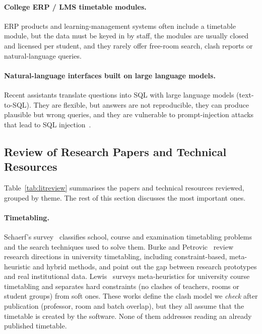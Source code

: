 \paragraph{College ERP / LMS timetable modules.}
ERP products and learning-management systems often include a timetable module, but the data must be
keyed in by staff, the modules are usually closed and licensed per student, and they rarely offer
free-room search, clash reports or natural-language queries.

\paragraph{Natural-language interfaces built on large language models.}
Recent assistants translate questions into SQL with large language models (text-to-SQL). They are
flexible, but answers are not reproducible, they can produce plausible but wrong queries, and they
are vulnerable to prompt-injection attacks that lead to SQL injection~\cite{pedro2023,greshake2023}.

\subsection{Review of Research Papers and Technical Resources}
Table~\ref{tab:litreview} summarises the papers and technical resources reviewed, grouped by
theme. The rest of this section discusses the most important ones.

\paragraph{Timetabling.}
Schaerf's survey~\cite{schaerf1999} classifies school, course and examination timetabling problems
and the search techniques used to solve them. Burke and Petrovic~\cite{burke2002} review research
directions in university timetabling, including constraint-based, meta-heuristic and hybrid methods,
and point out the gap between research prototypes and real institutional data. Lewis~\cite{lewis2008}
surveys meta-heuristics for university course timetabling and separates hard constraints (no clashes
of teachers, rooms or student groups) from soft ones. These works define the clash model we
\emph{check} after publication (professor, room and batch overlap), but they all assume that the
timetable is created by the software. None of them addresses reading an already published timetable.

